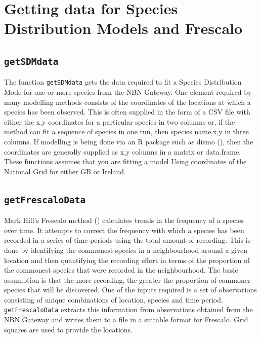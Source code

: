 \documentclass{article}
\begin{document}
\section{Getting data for Species Distribution Models and Frescalo}

\subsection{\texttt{getSDMdata}}
The function \texttt{getSDMdata} gets the data required to fit a Species 
Distribution Mode for one or more species from the NBN Gateway. One element
required by many
modelling methods consists of the coordinates of the locations at which a 
species has been observed. This is often supplied in the form of a CSV file with
either the x,y coordinates for a particular species in two columns or, if the
method can fit a sequence of species in one run, then species name,x,y in three
columns. If modelling is being done via an R package such as dismo 
(\cite{Hijmans2013}), then the coordinates are generally supplied as x,y columns
in a matrix or data.frame. These functions assumes that you are fitting a model
Using coordinates of the National Grid for either GB or Ireland.

\subsection{\texttt{getFrescaloData}}
Mark Hill's Frescalo method (\cite{Hill2012}) calculates trends in the frequency
of a species over time. It attempts to correct the frequency with which a
species has been recorded in a series of time periods using the total amount
of recording. This is done by identifying the commonest species in a 
neighbourhood around a given location and then quantifying the recording effort
in terms of the proportion of the commonest species that were recorded in the
neighbourhood. The basic assumption is that the more recording, the greater the
proportion of commoner species that will be discovered. One of the inputs 
required is a set of observations consisting of unique combinations of location,
species and time period. \texttt{getFrescaloData} extracts this information from
observations obtained from the NBN Gateway and writes them to a file in a
suitable format for Frescalo. Grid squares are used to provide the locations.
\end{document}
